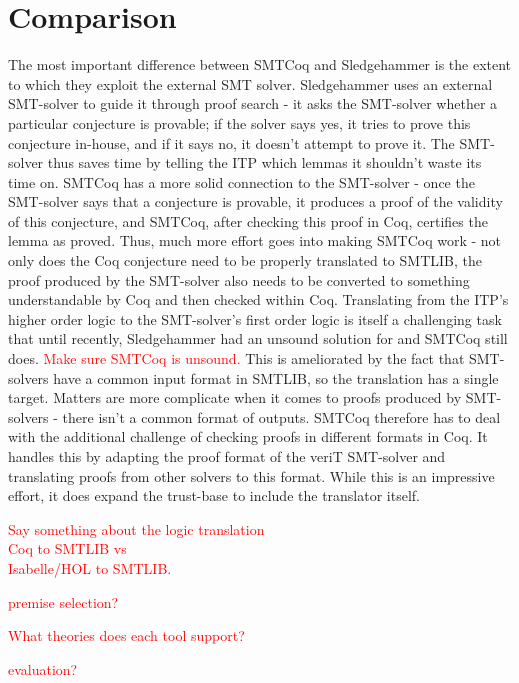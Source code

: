 \documentclass{article}
\begin{document}
\section{Comparison}
\label{sec:comp}
	The most important difference between SMTCoq and Sledgehammer
	is the extent to which they exploit the external SMT solver. 
	Sledgehammer uses an external SMT-solver to guide it through 
	proof search - it asks the SMT-solver whether a particular 
	conjecture is provable; if the solver says yes, 
	it tries to prove this conjecture in-house, and if it says 
	no, it doesn't attempt to prove it. The SMT-solver thus 
	saves time by telling the ITP which lemmas it shouldn't
	waste its time on. SMTCoq has a more solid connection to 
	the SMT-solver - once the SMT-solver says that a conjecture is 
	provable, it produces a proof of the validity of this 
	conjecture, and SMTCoq, after checking this proof in 
	Coq, certifies the lemma as proved. Thus,
	much more effort goes into making SMTCoq work - not only 
	does the Coq conjecture need to be properly translated to 
	SMTLIB, the proof produced by the SMT-solver also 
	needs to be converted to something understandable 
	by Coq and then checked within Coq. Translating from the ITP's 
	higher order logic to the SMT-solver's first order logic 
	is itself a challenging task that until recently, Sledgehammer 
	had an unsound solution for and SMTCoq still does. 
	\textcolor{red}{Make sure SMTCoq is unsound.} 
	This is ameliorated by the fact that
	SMT-solvers have a common input format in SMTLIB, so the 
	translation has a single target. Matters are more complicate 
	when it comes to proofs produced by SMT-solvers - there isn't 
	a common format of outputs. SMTCoq therefore has to deal with 
	the additional challenge of checking proofs in different 
	formats in Coq. It handles this by adapting the proof 
	format of the veriT SMT-solver and translating proofs 
	from other solvers to this format. While this is an impressive
	effort, it does expand the trust-base to include the 
	translator itself.
	
	\textcolor{red}{Say something about the logic translation \\
		Coq to SMTLIB vs \\
		Isabelle/HOL to SMTLIB.}
	
	\textcolor{red}{premise selection?}
	
	\textcolor{red}{What theories does each tool support?}
	
	\textcolor{red}{evaluation?}
	
	
\end{document}
